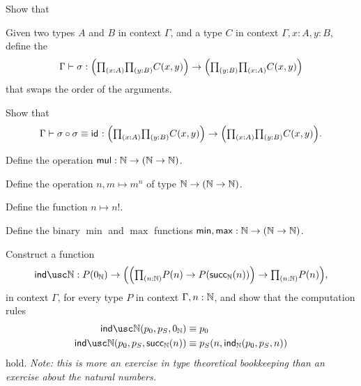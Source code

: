 \begin{exercises}
\begin{subexenum}
\begin{prooftree}
\end{prooftree}
\item Show that
\begin{prooftree}
\end{prooftree}
\end{subexenum}
\item \label{ex:swap}
\begin{subexenum}
\item Given two types $A$ and $B$ in context $\Gamma$, and a type $C$ in context $\Gamma,x:A,y:B$, define the 
\begin{equation*}
\Gamma\vdash \sigma:\Big(\prd{x:A}{y:B}C(x,y)\Big)\to\Big(\prd{y:B}{x:A}C(x,y)\Big)
\end{equation*}
that swaps the order of the arguments.
\item Show that
\begin{equation*}
\Gamma\vdash \sigma\circ\sigma\jdeq\idfunc:\Big(\prd{x:A}{y:B}C(x,y)\Big)\to \Big(\prd{x:A}{y:B}C(x,y)\Big).
\end{equation*}
\end{subexenum}
\item 
\begin{subexenum}
\item Define the  operation $\mathsf{mul}:\N\to(\N\to\N)$.
\item Define the  operation $n,m\mapsto m^n$ of type $\N\to (\N\to \N)$.
\item Define the  function $n\mapsto n!$. 
\end{subexenum}
\item Define the binary $\min$ and $\max$ functions $\mathsf{min},\mathsf{max}:\N\to(\N\to\N)$.
\item Construct a function
\begin{equation*}
\indN:P(\zeroN)\to \Big(\Big(\prd{n:\nat}P(n)\to P(\succN(n))\Big)\to \prd{n:\nat}P(n)\Big),
\end{equation*}
in context $\Gamma$, for every type $P$ in context $\Gamma,n:\N$, and show that the computation rules
\begin{align*}
\indN(p_0,p_S,\zeroN) & \jdeq p_0 \\
\indN(p_0,p_S,\succN(n)) & \jdeq p_S(n,\ind{\nat}(p_0,p_S,n))
\end{align*}
hold. \emph{Note: this is more an exercise in type theoretical bookkeeping than an exercise about the natural numbers.}
\end{exercises}
